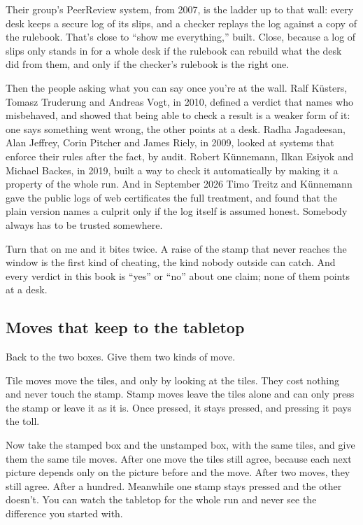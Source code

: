\documentclass[11pt,twoside]{article}
\theoremstyle{thielethm}
\theoremstyle{thieledef}
\theoremstyle{thieledef}
\theoremstyle{thieledef}
\theoremstyle{thielethm}
\theoremstyle{thieleobs}
\theoremstyle{thielethm}
\begin{document}
Their group's PeerReview system, from 2007, is the ladder up to that wall: every desk keeps a secure log of its slips, and a checker replays the log against a copy of the rulebook. That's close to ``show me everything,'' built. Close, because a log of slips only stands in for a whole desk if the rulebook can rebuild what the desk did from them, and only if the checker's rulebook is the right one.

Then the people asking what you can say once you're at the wall. Ralf Küsters, Tomasz Truderung and Andreas Vogt, in 2010, defined a verdict that names who misbehaved, and showed that being able to check a result is a weaker form of it: one says something went wrong, the other points at a desk. Radha Jagadeesan, Alan Jeffrey, Corin Pitcher and James Riely, in 2009, looked at systems that enforce their rules after the fact, by audit. Robert Künnemann, Ilkan Esiyok and Michael Backes, in 2019, built a way to check it automatically by making it a property of the whole run. And in September 2026 Timo Treitz and Künnemann gave the public logs of web certificates the full treatment, and found that the plain version names a culprit only if the log itself is assumed honest. Somebody always has to be trusted somewhere.

Turn that on me and it bites twice. A raise of the stamp that never reaches the window is the first kind of cheating, the kind nobody outside can catch. And every verdict in this book is ``yes'' or ``no'' about one claim; none of them points at a desk.

\subsection{Moves that keep to the tabletop}

Back to the two boxes. Give them two kinds of move.

Tile moves move the tiles, and only by looking at the tiles. They cost nothing and never touch the stamp. Stamp moves leave the tiles alone and can only press the stamp or leave it as it is. Once pressed, it stays pressed, and pressing it pays the toll.

Now take the stamped box and the unstamped box, with the same tiles, and give them the same tile moves. After one move the tiles still agree, because each next picture depends only on the picture before and the move. After two moves, they still agree. After a hundred. Meanwhile one stamp stays pressed and the other doesn't. You can watch the tabletop for the whole run and never see the difference you started with.
\end{document}

